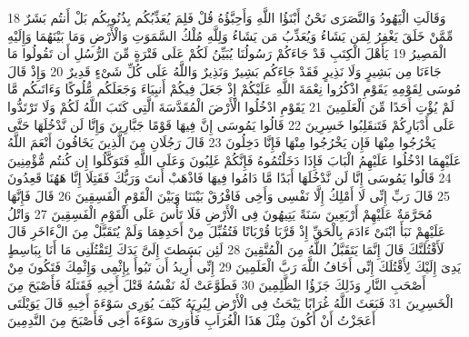{\tiny\colorbox{cl_aya}{18}} وَقَالَتِ الْيَهُودُ وَالنَّصَرَى نَحْنُ أَبْنَؤُا اللَّهِ وَأَحِبَّؤُهُ قُلْ فَلِمَ يُعَذِّبُكُم بِذُنُوبِكُم بَلْ أَنتُم بَشَرٌ مِّمَّنْ خَلَقَ يَغْفِرُ لِمَن يَشَاءُ وَيُعَذِّبُ مَن يَشَاءُ وَلِلَّهِ مُلْكُ السَّمَوَتِ وَالْأَرْضِ وَمَا بَيْنَهُمَا وَإِلَيْهِ الْمَصِيرُ
{\tiny\colorbox{cl_aya}{19}} يَأَهْلَ الْكِتَبِ قَدْ جَاءَكُمْ رَسُولُنَا يُبَيِّنُ لَكُمْ عَلَى فَتْرَةٍ مِّنَ الرُّسُلِ أَن تَقُولُوا مَا جَاءَنَا مِن بَشِيرٍ وَلَا نَذِيرٍ فَقَدْ جَاءَكُم بَشِيرٌ وَنَذِيرٌ وَاللَّهُ عَلَى كُلِّ شَىْءٍ قَدِيرٌ
{\tiny\colorbox{cl_aya}{20}} وَإِذْ قَالَ مُوسَى لِقَوْمِهِ يَقَوْمِ اذْكُرُوا نِعْمَةَ اللَّهِ عَلَيْكُمْ إِذْ جَعَلَ فِيكُمْ أَنبِيَاءَ وَجَعَلَكُم مُّلُوكًا وَءَاتَىكُم مَّا لَمْ يُؤْتِ أَحَدًا مِّنَ الْعَلَمِينَ
{\tiny\colorbox{cl_aya}{21}} يَقَوْمِ ادْخُلُوا الْأَرْضَ الْمُقَدَّسَةَ الَّتِى كَتَبَ اللَّهُ لَكُمْ وَلَا تَرْتَدُّوا عَلَى أَدْبَارِكُمْ فَتَنقَلِبُوا خَسِرِينَ
{\tiny\colorbox{cl_aya}{22}} قَالُوا يَمُوسَى إِنَّ فِيهَا قَوْمًا جَبَّارِينَ وَإِنَّا لَن نَّدْخُلَهَا حَتَّى يَخْرُجُوا مِنْهَا فَإِن يَخْرُجُوا مِنْهَا فَإِنَّا دَخِلُونَ
{\tiny\colorbox{cl_aya}{23}} قَالَ رَجُلَانِ مِنَ الَّذِينَ يَخَافُونَ أَنْعَمَ اللَّهُ عَلَيْهِمَا ادْخُلُوا عَلَيْهِمُ الْبَابَ فَإِذَا دَخَلْتُمُوهُ فَإِنَّكُمْ غَلِبُونَ وَعَلَى اللَّهِ فَتَوَكَّلُوا إِن كُنتُم مُّؤْمِنِينَ
{\tiny\colorbox{cl_aya}{24}} قَالُوا يَمُوسَى إِنَّا لَن نَّدْخُلَهَا أَبَدًا مَّا دَامُوا فِيهَا فَاذْهَبْ أَنتَ وَرَبُّكَ فَقَتِلَا إِنَّا هَهُنَا قَعِدُونَ
{\tiny\colorbox{cl_aya}{25}} قَالَ رَبِّ إِنِّى لَا أَمْلِكُ إِلَّا نَفْسِى وَأَخِى فَافْرُقْ بَيْنَنَا وَبَيْنَ الْقَوْمِ الْفَسِقِينَ
{\tiny\colorbox{cl_aya}{26}} قَالَ فَإِنَّهَا مُحَرَّمَةٌ عَلَيْهِمْ أَرْبَعِينَ سَنَةً يَتِيهُونَ فِى الْأَرْضِ فَلَا تَأْسَ عَلَى الْقَوْمِ الْفَسِقِينَ
{\tiny\colorbox{cl_aya}{27}} وَاتْلُ عَلَيْهِمْ نَبَأَ ابْنَىْ ءَادَمَ بِالْحَقِّ إِذْ قَرَّبَا قُرْبَانًا فَتُقُبِّلَ مِنْ أَحَدِهِمَا وَلَمْ يُتَقَبَّلْ مِنَ الْءَاخَرِ قَالَ لَأَقْتُلَنَّكَ قَالَ إِنَّمَا يَتَقَبَّلُ اللَّهُ مِنَ الْمُتَّقِينَ
{\tiny\colorbox{cl_aya}{28}} لَئِن بَسَطتَ إِلَىَّ يَدَكَ لِتَقْتُلَنِى مَا أَنَا بِبَاسِطٍ يَدِىَ إِلَيْكَ لِأَقْتُلَكَ إِنِّى أَخَافُ اللَّهَ رَبَّ الْعَلَمِينَ
{\tiny\colorbox{cl_aya}{29}} إِنِّى أُرِيدُ أَن تَبُوأَ بِإِثْمِى وَإِثْمِكَ فَتَكُونَ مِنْ أَصْحَبِ النَّارِ وَذَلِكَ جَزَؤُا الظَّلِمِينَ
{\tiny\colorbox{cl_aya}{30}} فَطَوَّعَتْ لَهُ نَفْسُهُ قَتْلَ أَخِيهِ فَقَتَلَهُ فَأَصْبَحَ مِنَ الْخَسِرِينَ
{\tiny\colorbox{cl_aya}{31}} فَبَعَثَ اللَّهُ غُرَابًا يَبْحَثُ فِى الْأَرْضِ لِيُرِيَهُ كَيْفَ يُوَرِى سَوْءَةَ أَخِيهِ قَالَ يَوَيْلَتَى أَعَجَزْتُ أَنْ أَكُونَ مِثْلَ هَذَا الْغُرَابِ فَأُوَرِىَ سَوْءَةَ أَخِى فَأَصْبَحَ مِنَ النَّدِمِينَ
